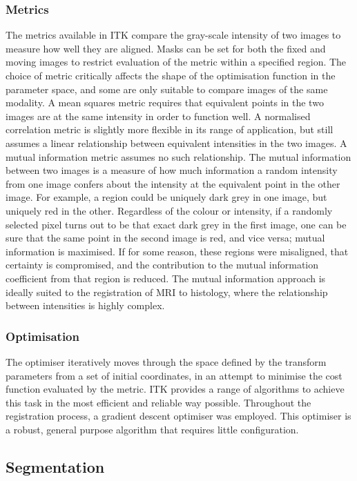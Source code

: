     \subsubsection{Metrics} %
    \label{ssub:metrics}
      The metrics available in ITK compare the gray-scale intensity of two images to measure how well they are aligned. Masks can be set for both the fixed and moving images to restrict evaluation of the metric within a specified region. The choice of metric critically affects the shape of the optimisation function in the parameter space, and some are only suitable to compare images of the same modality. A mean squares metric requires that equivalent points in the two images are at the same intensity in order to function well. A normalised correlation metric is slightly more flexible in its range of application, but still assumes a linear relationship between equivalent intensities in the two images. A mutual information metric assumes no such relationship. The mutual information between two images is a measure of how much information a random intensity from one image confers about the intensity at the equivalent point in the other image. For example, a region could be uniquely dark grey in one image, but uniquely red in the other. Regardless of the colour or intensity, if a randomly selected pixel turns out to be that exact dark grey in the first image, one can be sure that the same point in the second image is red, and vice versa; mutual information is maximised. If for some reason, these regions were misaligned, that certainty is compromised, and the contribution to the mutual information coefficient from that region is reduced. The mutual information approach is ideally suited to the registration of MRI to histology, where the relationship between intensities is highly complex.
  
    \subsubsection{Optimisation} %
    \label{ssub:optimisation}
    The optimiser iteratively moves through the space defined by the transform parameters from a set of initial coordinates, in an attempt to minimise the cost function evaluated by the metric. ITK provides a range of algorithms to achieve this task in the most efficient and reliable way possible. Throughout the registration process, a gradient descent optimiser was employed. This optimiser is a robust, general purpose algorithm that requires little configuration.
  
  \subsection{Segmentation} %
  \label{sub:segmentation}
  
